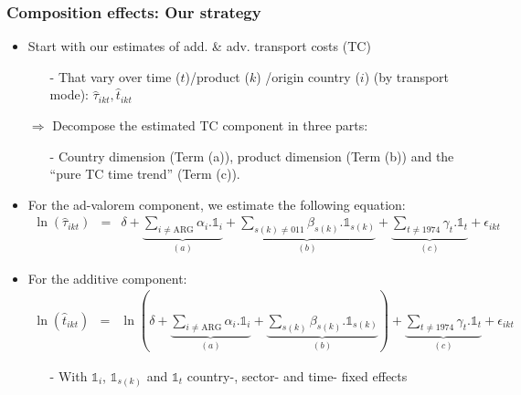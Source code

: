 \documentclass[10 pt,Helvetica, french]{beamer}
\begin{document}
\begin{frame}[label = app_compeffects_strategy]
\frametitle{Composition effects: Our strategy}
\begin{itemize}
\item Start with our estimates of add. \& adv. transport costs (TC) 
\begin{itemize}
\footnotesize
\item[-] That vary over time ($t$)/product ($k$) /origin country ($i$) (by transport mode): $\widehat{\tau}_{ikt}, \widehat{t}_{ikt}$ \vspace{0.1cm}
\end{itemize}
\item[$\Rightarrow$] Decompose the estimated TC component in three parts:  \vspace{0.1cm}
\begin{itemize}
\footnotesize
\item[-] Country dimension (Term (a)), product dimension (Term (b)) and the ``pure TC time trend'' (Term (c)).  \vspace{0.1cm}
\end{itemize}
\item For the ad-valorem component, we estimate the following equation:
\footnotesize
\begin{eqnarray}
\ln(\widehat{\tau}_{ikt})&=&\delta +\underbrace{\sum_{i \neq \text{ARG}}\alpha_i.\mathbb{1}_i}_{(a)} + \underbrace{\sum_{s(k)\neq \text{011}}\beta_{s(k)}.\mathbb{1}_{s(k)}}_{(b)} + \underbrace{\sum_{t \neq 1974}\gamma_t.\mathbb{1}_t}_{(c)}+\epsilon_{ikt} \label{eq:compeffects_mult}
\end{eqnarray}
\normalsize
\item For the additive component:
\footnotesize
\begin{eqnarray}
\ln(\widehat{t}_{ikt})&=&\ln\left( \delta + \underbrace{\sum_{i \neq \text{ARG}}  \alpha_i.\mathbb{1}_i}_{(a)}+\underbrace{\sum_{s(k)}\beta_{s(k)}.\mathbb{1}_{s(k)}}_{(b)}\right) + \underbrace{\sum_{t \neq 1974}\gamma_t.\mathbb{1}_t}_{(c)}+\epsilon_{ikt} \label{eq:compeffects_add}
\end{eqnarray}
\normalsize
\begin{itemize}
\item[-] With $\mathbb{1}_i$, $\mathbb{1}_{s(k)}$ and $\mathbb{1}_{t}$ country-, sector- and time- fixed effects \vspace{0.1cm}
\end{itemize}

\end{itemize}
\end{frame}
\end{document}
